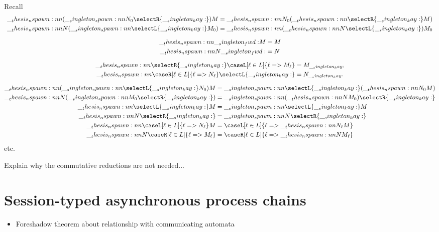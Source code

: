 Recall 
\begin{gather*}
  \begin{aligned}
    \nspawn{(\spawn{N_0}{\selectR{\kay}})}{M}
      &= \nspawn{N_0}{(\nspawn{\selectR{\kay}}{M})}
    \\
    \nspawn{N}{(\spawn{\selectL{\kay}}{M_0})}
      &= \nspawn{(\nspawn{N}{\selectL{\kay}})}{M_0}
  \end{aligned}
  \\[2\jot]
  \begin{aligned}
    \nspawn{\fwd}{M}
      &= M
    \\
    \nspawn{N}{\fwd}
      &= N
  \end{aligned}
  \\[2\jot]
  \begin{aligned}
    \nspawn{\selectR{\kay}}{\caseL[\ell \in L]{\ell => M_{\ell}}}
      &= M_{\kay}
    \\
    \nspawn{\caseR[\ell \in L]{\ell => N_{\ell}}}{\selectL{\kay}}
      &= N_{\kay}
  \end{aligned}
  \\[2\jot]
  \begin{aligned}
    \nspawn{(\spawn{\selectL{\kay}}{N_0})}{M}
      &= \spawn{\selectL{\kay}}{(\nspawn{N_0}{M})}
    \\
    \nspawn{N}{(\spawn{M_0}{\selectR{\kay}})}
      &= \spawn{(\nspawn{N}{M_0})}{\selectR{\kay}}
    \\
    \nspawn{\selectL{\kay}}{M}
      &= \spawn{\selectL{\kay}}{M}
    \\
    \nspawn{N}{\selectR{\kay}}
      &= \spawn{N}{\selectR{\kay}}
    \\
    \nspawn{\caseL[\ell \in L]{\ell => N_{\ell}}}{M}
      &= \caseL[\ell \in L]{\ell => \nspawn{N_{\ell}}{M}}
    \\
    \nspawn{N}{\caseR[\ell \in L]{\ell => M_{\ell}}}
      &= \caseR[\ell \in L]{\ell => \nspawn{N}{M_{\ell}}}
  \end{aligned}
\end{gather*}
etc.

Explain why the commutative reductions are not needed...


\section{Session-typed asynchronous process chains}

\begin{itemize}
\item Foreshadow theorem about relationship with communicating automata
\end{itemize}

